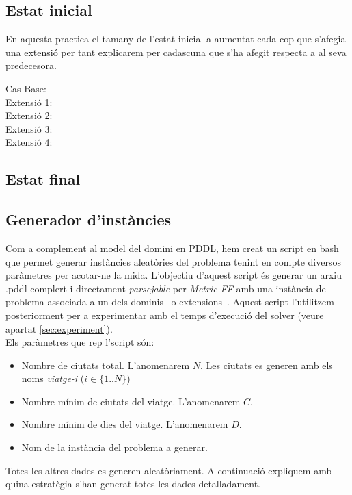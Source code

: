 \documentclass[11pt,a4paper]{article}
\begin{document}
\subsection{Estat inicial}
En aquesta practica el tamany de l'estat inicial a aumentat cada cop que s'afegia una extensió per tant explicarem per cadascuna que s'ha afegit respecta a al seva predecesora.
\begin{description}
\item[Cas Base:] 
\item[Extensió 1:] 
\item[Extensió 2:] 
\item[Extensió 3:] 
\item[Extensió 4:] 
\end{description}


\subsection{Estat final}

\subsection{Generador d'instàncies}
\label{sec:script}

Com a complement al model del domini en PDDL, hem creat un script en bash que permet generar instàncies aleatòries del problema tenint en compte diversos paràmetres per acotar-ne la mida. L'objectiu d'aquest script és generar un arxiu .pddl complert i directament \emph{parsejable} per \emph{Metric-FF} amb una instància de problema associada a un dels dominis --o extensions--. Aquest script l'utilitzem posteriorment per a experimentar amb el temps d'execució del solver (veure apartat \ref{sec:experiment}).\\

Els paràmetres que rep l'script són:
\begin{itemize}
  \item{Nombre de ciutats total. L'anomenarem $N$. Les ciutats es generen amb els noms \emph{viatge-i} ($i \in \{1..N\}$) }
  \item{Nombre mínim de ciutats del viatge. L'anomenarem $C$.}
  \item{Nombre mínim de dies del viatge. L'anomenarem $D$.}
  \item{Nom de la instància del problema a generar.}
\end{itemize}

Totes les altres dades es generen aleatòriament. A continuació expliquem amb quina estratègia s'han generat totes les dades detalladament.
\end{document}

